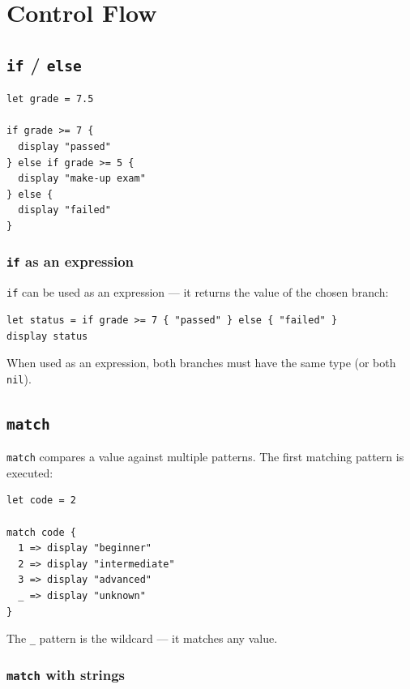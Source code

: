\chapter{Control Flow}

\section{\texttt{if} / \texttt{else}}

\begin{lstlisting}[caption={Basic if/else structure}]
let grade = 7.5

if grade >= 7 {
  display "passed"
} else if grade >= 5 {
  display "make-up exam"
} else {
  display "failed"
}
\end{lstlisting}

\subsection*{\texttt{if} as an expression}

\lstinline{if} can be used as an expression — it returns the value of the
chosen branch:

\begin{lstlisting}
let status = if grade >= 7 { "passed" } else { "failed" }
display status
\end{lstlisting}

When used as an expression, both branches must have the same type (or both
\texttt{nil}).

\section{\texttt{match}}

\lstinline{match} compares a value against multiple patterns. The first
matching pattern is executed:

\begin{lstlisting}[caption={match with literals}]
let code = 2

match code {
  1 => display "beginner"
  2 => display "intermediate"
  3 => display "advanced"
  _ => display "unknown"
}
\end{lstlisting}

The \lstinline{_} pattern is the wildcard — it matches any value.

\subsection*{\texttt{match} with strings}

